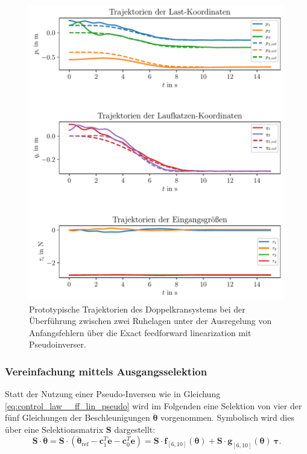 \begin{figure}[H]
	\begin{center}
		\includegraphics[scale=1]{Pictures/feedforward_lin_pseudo_controller_initial_error}
	\end{center}
	\caption[Trajektorien Ruhelagenüberführung mit Regelung über Exact feedforward linearization (Pseudoinverse)]
	{Prototypische Trajektorien des Doppelkransystems bei der Überführung zwischen zwei Ruhelagen unter der Ausregelung von Anfangsfehlern über die Exact feedforward linearization mit Pseudoinverser.}
	\label{fig_feedforward_pseudo_controller_initial_error}
\end{figure}

\subsubsection{Vereinfachung mittels Ausgangsselektion}
Statt der Nutzung einer Pseudo-Inversen wie in Gleichung \eqref{eq:control_law__ff_lin_pseudo} wird im Folgenden eine Selektion von vier der fünf Gleichungen der Beschleunigungen $\ddot{\boldsymbol{\theta}}$ vorgenommen. Symbolisch wird dies über eine Selektionsmatrix $\mathbf{S}$ dargestellt:
\begin{equation}
	\mathbf{S} \cdot \ddot{\boldsymbol{\theta}} = \mathbf{S} \cdot (\ddot{\boldsymbol{\theta}}_{\text{ref}} - \mathbf{c}_1^T \dot{\mathbf{e}} - \mathbf{c}_0^T \mathbf{e}) = \mathbf{S} \cdot \mathbf{f}_{[6, 10]}(\boldsymbol{\theta}) + \mathbf{S} \cdot \mathbf{g}_{[6, 10]}(\boldsymbol{\theta}) \ \boldsymbol{\tau}.
\end{equation} 

